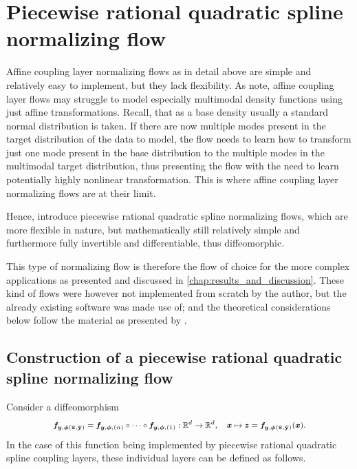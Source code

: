 \documentclass[a4paper,12pt]{report}
\def\lk#1{{\color{black}{#1}}}
\begin{document}
\section{Piecewise rational quadratic spline normalizing flow}\label{subsec:normflowspiecewiserational}
Affine coupling layer normalizing flows as \lk{described} in detail above are simple and relatively easy to implement, but they lack flexibility. As \cite[p.3]{Durkan.10.06.2019} note, affine coupling layer flows may struggle to model especially multimodal density functions using just affine transformations. Recall, that as a base density usually a standard normal distribution is taken. If there are now multiple modes present in the target distribution of the data to model, the flow needs to learn how to transform just one mode present in the base distribution to the multiple modes in the multimodal target distribution, thus presenting the flow with the need to learn potentially highly nonlinear transformation\lk{s}. This is where affine coupling layer normalizing flows are at their limit. \lk{Since inversions of stellar atmospheres are especially prone to sometimes have more than one solution, a normalizing flow applied to learn stellar inversions needs to be able to model multimodal densities of the atmospheric parameters.}

Hence, \cite[p.4]{Durkan.10.06.2019} introduce piecewise rational quadratic spline normalizing flows, which are more flexible in nature, but mathematically still relatively simple and furthermore fully invertible and differentiable, thus diffeomorphic.

This type of normalizing flow is therefore the flow of choice for the more complex applications as presented and discussed in \cref{chap:results_and_discussion}. These kind of flows were however not implemented from scratch by the author, but the already existing software \cite{nflows} was made use of; and the theoretical considerations below follow the material as presented by \cite{Durkan.10.06.2019}.

\subsection{Construction of a piecewise rational quadratic spline normalizing flow}\label{sec:piecewisequadraticspline}
Consider a diffeomorphism \begin{align}\footnotesize\begin{aligned}
\bm{f}_{\bm{y},\bm{\phi}(\hat{\boldsymbol{\mathbf{x}}},\hat{\boldsymbol{\mathbf{y}}})} = \bm{f}_{\bm{y},\bm{\phi},(n)}\circ \dots \circ \bm{f}_{\bm{y},\bm{\phi},(1)}: \mathbb{R}^d \rightarrow \mathbb{R}^d, \quad \bm{x} \mapsto \bm{z} = \bm{f}_{\bm{y},\bm{\phi}(\hat{\boldsymbol{\mathbf{x}}},\hat{\boldsymbol{\mathbf{y}}})}(\bm{x}).
\end{aligned}\end{align} In the case of this function being implemented by piecewise rational quadratic spline coupling layers, these individual layers can be defined as follows.
\end{document}
